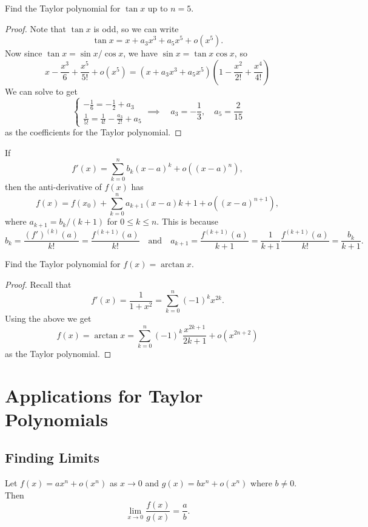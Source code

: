 \begin{example}
Find the Taylor polynomial for $\tan x$ up to $n = 5$.
\end{example}

\begin{proof}
Note that $\tan x$ is odd, so we can write
\[
  \tan x = x + a_3 x^3 + a_5 x^5 + o(x^5).
\]
Now since $\tan x = \sin x / \cos x$, we have
$\sin x = \tan x \cos x$, so
\[
  x - \frac{x^3}{6} + \frac{x^5}{5!} + o(x^5)
  = (x + a_3 x^3 + a_5x^5)(1 - \frac{x^2}{2!} + \frac{x^4}{4!})
\]
We can solve to get
\[
  \begin{cases}
    -\frac{1}{6} = -\frac{1}{2} + a_3 \\
    \frac{1}{5!} = \frac{1}{4!} - \frac{a_3}{2!} + a_5
  \end{cases}
  \implies \quad
  a_3 = -\frac{1}{3}, \quad
  a_5 = \frac{2}{15}
\]
as the coefficients for the Taylor polynomial.
\end{proof}

\begin{remark}
  If
  \[
    f'(x) = \sum_{k = 0}^n b_k (x - a)^k + o((x - a)^n),
  \]
  then the anti-derivative of $f(x)$ has
  \[f(x) = f(x_0) + \sum_{k = 0}^n a_{k + 1} (x - a){k + 1} + o((x - a)^{n + 1}),\]
  where $a_{k + 1} = b_k / (k + 1)$ for $0 \le k \le n$.
  This is because
  \[
    b_k = \frac{(f')^{(k)}(a)}{k!} = \frac{f^{(k + 1)}(a)}{k!}
    \quad \text{and} \quad
    a_{k + 1} = \frac{f^{(k + 1)}(a)}{k + 1}
    = \frac{1}{k + 1} \frac{f^{(k + 1)}(a)}{k!}
    = \frac{b_k}{k + 1}.
  \]
\end{remark}

\begin{example}
  Find the Taylor polynomial for $f(x) = \arctan x$.
\end{example}

\begin{proof}
  Recall that
  \[f'(x) = \frac{1}{1 + x^2} = \sum_{k = 0}^n (-1)^k x^{2k}.\]
  Using the above we get
  \[
    f(x) = \arctan x = \sum_{k = 0}^n (-1)^k \frac{x^{2k + 1}}{2k + 1} + o(x^{2n + 2})
  \]
  as the Taylor polynomial.
\end{proof}

\section{Applications for Taylor Polynomials}
\subsection{Finding Limits}
\begin{remark}
Let $f(x) = ax^n + o(x^n)$ as $x \to 0$
and $g(x) = bx^n + o(x^n)$ where $b \ne 0$.
Then
\[
  \lim_{x \to 0} \frac{f(x)}{g(x)} = \frac{a}{b}.
\]
\end{remark}

